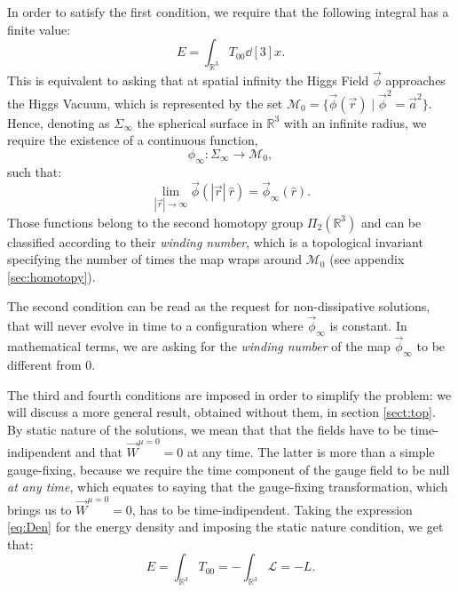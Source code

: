 \documentclass[main.tex]{subfiles}
\begin{document}
In order to satisfy the first condition, we require that the following integral has a finite value: 
\begin{equation}
E = \int_{\mathbb{R}^3} T_{00} \dd[3]{x}.
\end{equation}
This is equivalent to asking that at spatial infinity the Higgs Field $\vec{\phi}$ approaches the Higgs Vacuum, which is represented by the set $\mathcal{M}_0 = \{ \vec{\phi}(\vec{r})  \mid  \vec{\phi}^2 = \vec{a}^2 \}$. 
Hence, denoting as $\Sigma_{\infty}$ the spherical surface in $\mathbb{R}^3$ with an infinite radius, we require the existence of a continuous function, 
 \begin{equation}
     \phi_{\infty} \colon \Sigma_{\infty}  \to \mathcal{M}_0 ,
  \end{equation}
 such that:
 \begin{equation}
     \lim_{|\vec{r}|\to \infty} \vec{\phi}(|\vec{r}| \ \hat{r}) = \vec{\phi}_{\infty}(\hat{r}).
 \end{equation}
  Those functions belong to the second homotopy group $\Pi_2(\mathbb{R}^3)$ and can be classified according to their \textit{winding number}, which is a topological invariant specifying the number of times the map wraps around $\mathcal{M}_0$ (see appendix \ref{sec:homotopy}).
  \medskip
  
  The second condition can be read as the request for non-dissipative solutions, that will never evolve in time to a configuration where $\vec{\phi}_{\infty}$ is constant. In mathematical terms, we are asking for the \textit{winding number} of the map $\vec{\phi}_{\infty}$ to be different from 0.
  \medskip
  
  The third and fourth conditions are imposed in order to simplify the problem: we will discuss a more general result, obtained without them, in section \ref{sect:top}.
  By static nature of the solutions, we mean that that the fields have to be time-indipendent and that $\vec{W}^{\mu = 0}= 0$ at any time. The latter is more than a simple gauge-fixing, because we require the time component of the gauge field to be null \textit{at any time}, which equates to saying that the gauge-fixing transformation, which brings us to $ \vec{W}^{\mu = 0}= 0$, has to be time-indipendent. Taking the expression \eqref{eq:Den} for the energy density and imposing the static nature condition, we get that: 
  \begin{equation}
      E = \int_{\mathbb{R}^3} T_{00} = - \int_{\mathbb{R}^3} \mathcal{L} = -L.
      \label{eq:En}
  \end{equation}
 
\end{document}
